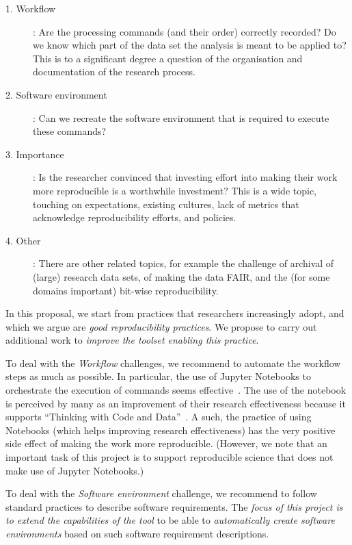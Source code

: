 \begin{description}
\item[1. Workflow]: Are the processing commands (and their order)
correctly recorded? Do we know which part of the data set the analysis is meant
to be applied to? This is to a significant degree a question of the organisation
and documentation of the research process.

\item[2. Software environment]: Can we recreate the software environment that is
required to execute these commands?

\item[3. Importance]: Is the researcher convinced that investing effort into making
their work more reproducible is a worthwhile investment? This is a wide topic,
touching on expectations, existing cultures, lack of metrics that acknowledge
reproducibility efforts, and policies.

\item[4. Other]: There are other related topics, for example the challenge of
archival of (large) research data sets, of making the data FAIR, and the (for
some domains important) bit-wise reproducibility.
\end{description}

In this proposal, we start from practices that researchers increasingly adopt,
and which we argue are \emph{good reproducibility practices}. We propose to carry
out additional work to \emph{improve the toolset enabling this practice}.

To deal with the \emph{Workflow} challenges, we recommend to automate the
workflow steps as much as possible. In particular, the use of Jupyter Notebooks
to orchestrate the execution of commands seems effective~\cite{Beg2021}.
The use of the notebook is
perceived by many as an improvement of their research effectiveness because
it supports ``Thinking with Code and Data''~\cite{Granger2021}. A such, the
practice of using Notebooks (which helps improving research effectiveness) has
the very positive side effect of making the work more reproducible. (However, we
note that an important task of this project is to support reproducible science
that does not make use of Jupyter Notebooks.)

To deal with the \emph{Software environment} challenge, we recommend to follow
standard practices to describe software requirements. The \emph{focus of this
project is to extend the capabilities of the \repotodocker{} tool} to be able to
\emph{automatically create software environments} based on such software
requirement descriptions.

